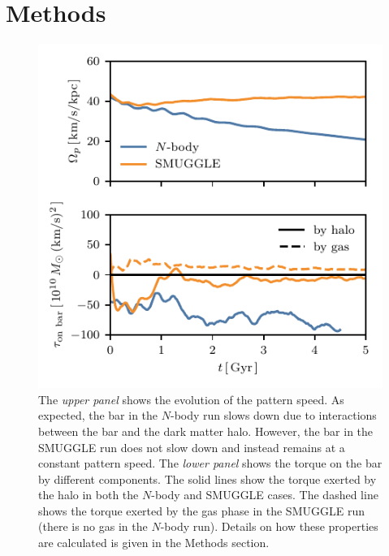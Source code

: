 \documentclass[fleqn,usenatbib]{mnras}
\newcommand{\Nbody}{$N$-body}
\begin{document}

\section{Methods}
\label{sec:methods}
\begin{figure}
    \centering
    \includegraphics[width=\columnwidth]{fig/ps_torque.pdf}
    \caption{The \textit{upper panel} shows the evolution
    of the pattern speed. As expected, the bar in the \Nbody{} run slows down due
    to interactions between the bar and the dark matter halo. However, the bar in
    the SMUGGLE run does not slow down and instead remains at a constant pattern
    speed. The \textit{lower panel} shows the torque on the bar
    by different components. The solid lines show the torque exerted by the halo
    in both the \Nbody{} and SMUGGLE cases. The dashed line shows the torque
    exerted by the gas phase in the SMUGGLE run (there is no gas in the \Nbody{}
    run). Details on how these properties are calculated is given in the Methods
    section.}\label{fig:prop}
\end{figure}
\end{document}
